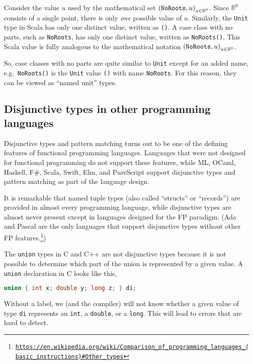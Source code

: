 Consider the value $u$ used by the mathematical set $\left(\text{\texttt{NoRoots}},u\right)_{u\in\mathbb{R}^{0}}$.
Since $\mathbb{R}^{0}$ consists of a single point, there is only
\emph{one} possible value of $u$. Similarly, the \lstinline!Unit!
type in Scala has only one distinct value, written as \lstinline!()!.
A case class with no parts, such as \lstinline!NoRoots!, has only
one distinct value, written as \lstinline!NoRoots()!. This Scala
value is fully analogous to the mathematical notation $\left(\text{\texttt{NoRoots}},u\right)_{u\in\mathbb{R}^{0}}$.

So, case classes with no parts are quite similar to \lstinline!Unit!
except for an added name, e.g.~\lstinline!NoRoots()! is the \lstinline!Unit!
value \lstinline!()! with name \lstinline!NoRoots!. For this reason,
they can be viewed as \textsf{``}named unit\textsf{''} types.

\subsection{Disjunctive types in other programming languages}

Disjunctive types and pattern matching turns out to be one of the
defining features of functional programming languages. Languages that
were not designed for functional programming do not support these
features, while ML, OCaml, Haskell, F\#, Scala, Swift, Elm, and PureScript
support disjunctive types and pattern matching as part of the language
design. 

It is remarkable that named tuple types (also called \textsf{``}structs\textsf{''}
or \textsf{``}records\textsf{''}) are provided in almost every programming language,
while disjunctive types are almost never present except in languages
designed for the FP paradigm. (Ada and Pascal are the only languages
that support disjunctive types without other FP features.\footnote{\texttt{\href{https://en.wikipedia.org/wiki/Comparison_of_programming_languages_(basic_instructions)\#Other_types}{https://en.wikipedia.org/wiki/Comparison\_of\_programming\_languages\_(basic\_instructions)\#Other\_types}}})

The \lstinline!union! types in C and C++ are not disjunctive types
because it is not possible to determine which part of the union is
represented by a given value. A \lstinline!union! declaration in
C looks like this,
\begin{lstlisting}[language=C]
union { int x; double y; long z; } di;
\end{lstlisting}
Without a label, we (and the compiler) will not know whether a given
value of type \lstinline!di! represents an \lstinline!int!, a \lstinline!double!,
or a \lstinline!long!. This will lead to errors that are hard to
detect.

